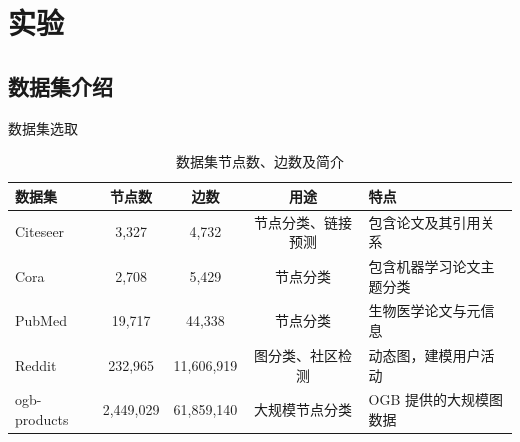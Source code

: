 \documentclass[UTF8, aspectratio=169,10pt]{beamer}%
\numberwithin{equation}{section}
\numberwithin{figure}{section}
\numberwithin{table}{section}
\theoremstyle{definition}
\begin{document}
	
	
	
\section{实验}
\subsection{数据集介绍}
\begin{frame}{数据集选取}
	\begin{table}[h!]
		\centering
		\caption{数据集节点数、边数及简介}
		\begin{tabularx}{\textwidth}{@{}lcccX@{}}
			\toprule[1.5pt]
			\textbf{数据集} & \textbf{节点数} & \textbf{边数} & \textbf{用途} & \textbf{特点} \\ 
			\midrule
			Citeseer     & 3,327         & 4,732        & 节点分类、链接预测 & 包含论文及其引用关系 \\ 
			Cora         & 2,708         & 5,429        & 节点分类           & 包含机器学习论文主题分类 \\ 
			PubMed       & 19,717        & 44,338       & 节点分类           & 生物医学论文与元信息 \\ 
			Reddit       & 232,965       & 11,606,919   & 图分类、社区检测   & 动态图，建模用户活动 \\ 
			ogb-products & 2,449,029     & 61,859,140   & 大规模节点分类     & OGB 提供的大规模图数据 \\ 
			\bottomrule[1.5pt]
		\end{tabularx}
		
		\label{tab:dataset_overview}
	\end{table}
\end{frame}
\end{document}
